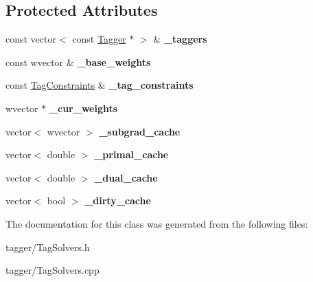\subsection*{Protected Attributes}
\begin{DoxyCompactItemize}
\item 
\hypertarget{class_tagger_dual_a0068b276abb09b34ab08e9cc14947ee3}{
const vector$<$ const \hyperlink{class_tagger}{Tagger} $\ast$ $>$ \& {\bfseries \_\-taggers}}
\label{class_tagger_dual_a0068b276abb09b34ab08e9cc14947ee3}

\item 
\hypertarget{class_tagger_dual_a0073fa0f694790d365ca959ed8386e26}{
const wvector \& {\bfseries \_\-base\_\-weights}}
\label{class_tagger_dual_a0073fa0f694790d365ca959ed8386e26}

\item 
\hypertarget{class_tagger_dual_ab8845276b234c329c967529091f51e8f}{
const \hyperlink{class_tag_constraints}{TagConstraints} \& {\bfseries \_\-tag\_\-constraints}}
\label{class_tagger_dual_ab8845276b234c329c967529091f51e8f}

\item 
\hypertarget{class_tagger_dual_a9974a79ebf2547f3e80e9d68d06b49be}{
wvector $\ast$ {\bfseries \_\-cur\_\-weights}}
\label{class_tagger_dual_a9974a79ebf2547f3e80e9d68d06b49be}

\item 
\hypertarget{class_tagger_dual_a57232f5a7702b7715f8517d408086dbe}{
vector$<$ wvector $>$ {\bfseries \_\-subgrad\_\-cache}}
\label{class_tagger_dual_a57232f5a7702b7715f8517d408086dbe}

\item 
\hypertarget{class_tagger_dual_a47cdc599b2c73836f33aa443053e3534}{
vector$<$ double $>$ {\bfseries \_\-primal\_\-cache}}
\label{class_tagger_dual_a47cdc599b2c73836f33aa443053e3534}

\item 
\hypertarget{class_tagger_dual_a4472c903ae391e7cc4912bc473a9eae2}{
vector$<$ double $>$ {\bfseries \_\-dual\_\-cache}}
\label{class_tagger_dual_a4472c903ae391e7cc4912bc473a9eae2}

\item 
\hypertarget{class_tagger_dual_a259d5ef5c5020c75a68527950ff41310}{
vector$<$ bool $>$ {\bfseries \_\-dirty\_\-cache}}
\label{class_tagger_dual_a259d5ef5c5020c75a68527950ff41310}

\end{DoxyCompactItemize}


The documentation for this class was generated from the following files:\begin{DoxyCompactItemize}
\item 
tagger/TagSolvers.h\item 
tagger/TagSolvers.cpp\end{DoxyCompactItemize}
